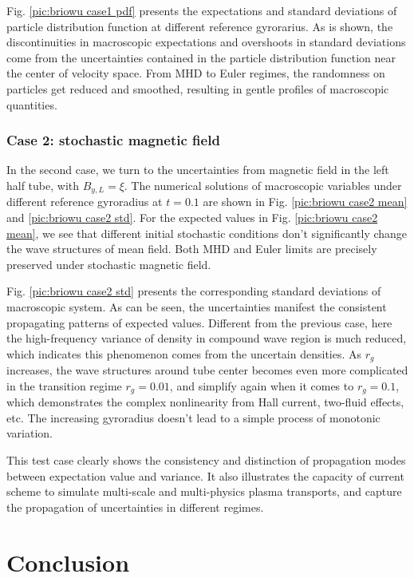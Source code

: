 \documentclass[preprint,3p,12pt,sort&compress]{elsarticle}
\begin{document}
Fig. \ref{pic:briowu case1 pdf} presents the expectations and standard deviations of particle distribution function at different reference gyrorarius.
As is shown, the discontinuities in macroscopic expectations and overshoots in standard deviations come from the uncertainties contained in the particle distribution function near the center of velocity space. 
From MHD to Euler regimes, the randomness on particles get reduced and smoothed, resulting in gentle profiles of macroscopic quantities.

\subsubsection{Case 2: stochastic magnetic field}

In the second case, we turn to the uncertainties from magnetic field in the left half tube, with $B_{y,L}=\xi$.
The numerical solutions of macroscopic variables under different reference gyroradius at $t = 0.1$ are shown in Fig. \ref{pic:briowu case2 mean} and \ref{pic:briowu case2 std}.
For the expected values in Fig. \ref{pic:briowu case2 mean}, we see that different initial stochastic conditions don't significantly change the wave structures of mean field.
Both MHD and Euler limits are precisely preserved under stochastic magnetic field. 

Fig. \ref{pic:briowu case2 std} presents the corresponding standard deviations of macroscopic system.
As can be seen, the uncertainties manifest the consistent propagating patterns of expected values.
Different from the previous case, here the high-frequency variance of density in compound wave region is much reduced, which indicates this phenomenon comes from the uncertain densities.
As $r_g$ increases, the wave structures around tube center becomes even more complicated in the transition regime $r_g=0.01$, and simplify again when it comes to $r_g=0.1$, which demonstrates the complex nonlinearity from Hall current, two-fluid effects, etc.
The increasing gyroradius doesn't lead to a simple process of monotonic variation.

This test case clearly shows the consistency and distinction of propagation modes between expectation value and variance. It also illustrates the capacity of current scheme to simulate multi-scale and multi-physics plasma transports, and capture the propagation of uncertainties in different regimes.

\section{Conclusion}
\end{document}
